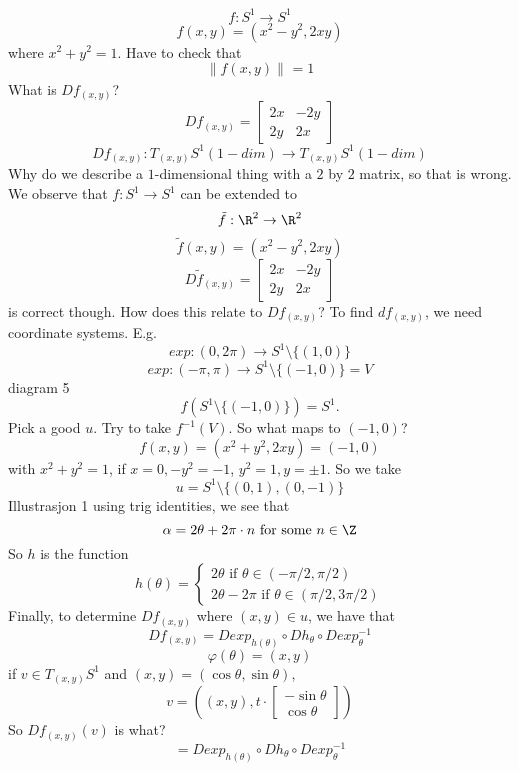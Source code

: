 \begin{example}
  $$f:S^1\to S^1$$
  $$f(x,y)=(x^2-y^2,2xy)$$
  where $x^2+y^2=1$. Have to check that
    $$\| f(x,y) \|_{}=1$$
  What is $Df_{(x,y)}$?
    $$Df_{(x,y)}=
    \begin{bmatrix}
      2x & -2y \\
      2y & 2x
    \end{bmatrix}
    $$
  $$Df_{(x,y)}:T_{(x,y)}S^1 (1-dim)\to T_{(x,y)}S^1 (1-dim)$$
  Why do we describe a $1$-dimensional thing with a $2$ by $2$ matrix, so that is wrong.
  \newline We observe that $f:S^1\to S^1$ can be extended to
    $$\tilde{f}:\R^2\to\R^2$$
    $$\tilde{f}(x,y)=(x^2-y^2,2xy)$$
    $$D\tilde{f}_{(x,y)}=
    \begin{bmatrix}
      2x & -2y \\
      2y & 2x
    \end{bmatrix}
    $$
    is correct though.
    \newline How does this relate to $Df_{(x,y)}$?
    To find $df_{(x,y)}$, we need coordinate systems. E.g.
       $$exp:(0,2\pi)\to S^1\setminus\{(1,0)\}$$
       $$exp:(-\pi,\pi)\to S^1\setminus\{(-1,0)\}=V$$
      diagram 5
      $$f(S^1\setminus\{(-1,0)\})=S^1.$$
    Pick a good $u$. Try to take $f ^{-1}(V)$. So what maps to $(-1,0)$?
      $$f(x,y)=(x^2+y^2,2xy)=(-1,0)$$
    with $x^2+y^2=1$, if $x=0, -y^2=-1$, $y^2= 1, y=\pm 1$.
    \newline So we take
      $$u=S^1\setminus\{(0,1),(0,-1)\}$$
      Illustrasjon 1
    \newline using trig identities, we see that
      $$\alpha=2\theta + 2\pi \cdot n \text{ for some }n\in \Z$$
    So $h$ is the function
  $$
  h(\theta)=
  \begin{cases}
    2\theta \text{  if }\theta \in (-\pi/2,\pi/2) \\
    2\theta -2\pi \text{  if }\theta \in (\pi/2,3\pi/2)
  \end{cases}
  $$
    Finally, to determine $Df_{(x,y)}$ where $(x,y)\in u$, we have that
      $$Df_{(x,y)}=Dexp_{h(\theta)} \circ Dh_{\theta}\circ Dexp ^{-1}_{\theta}$$
      $$\varphi (\theta)=(x,y)$$
    if $v\in T_{(x,y)}S^1$ and $(x,y)=(\cos \theta, \sin \theta)$,
      $$v=\left((x,y), t \cdot
\begin{bmatrix}
  -\sin \theta \\
  \cos \theta
\end{bmatrix}
       \right)$$
       So $Df_{(x,y)}(v)$ is what?
      $$=Dexp_{h(\theta)} \circ Dh_{\theta}\circ Dexp ^{-1}_{\theta}
$$
\end{example}
